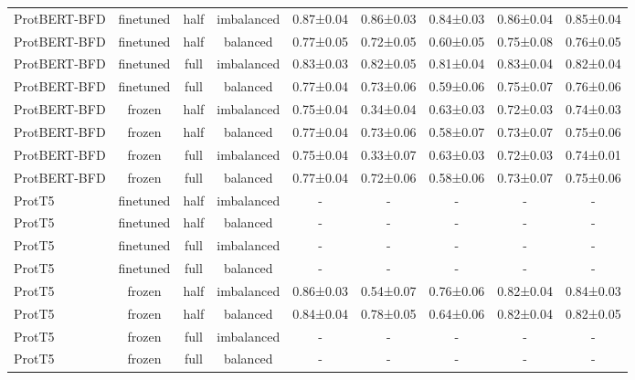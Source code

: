 \begin{tabular}{lcccccccc}
ProtBERT-BFD &      finetuned &      half & imbalanced & 0.87±0.04 & 0.86±0.03 & 0.84±0.03 & 0.86±0.04 & 0.85±0.04 \\
ProtBERT-BFD &      finetuned &      half &   balanced & 0.77±0.05 & 0.72±0.05 & 0.60±0.05 & 0.75±0.08 & 0.76±0.05 \\
ProtBERT-BFD &      finetuned &      full & imbalanced & 0.83±0.03 & 0.82±0.05 & 0.81±0.04 & 0.83±0.04 & 0.82±0.04 \\
ProtBERT-BFD &      finetuned &      full &   balanced & 0.77±0.04 & 0.73±0.06 & 0.59±0.06 & 0.75±0.07 & 0.76±0.06 \\
ProtBERT-BFD &         frozen &      half & imbalanced & 0.75±0.04 & 0.34±0.04 & 0.63±0.03 & 0.72±0.03 & 0.74±0.03 \\
ProtBERT-BFD &         frozen &      half &   balanced & 0.77±0.04 & 0.73±0.06 & 0.58±0.07 & 0.73±0.07 & 0.75±0.06 \\
ProtBERT-BFD &         frozen &      full & imbalanced & 0.75±0.04 & 0.33±0.07 & 0.63±0.03 & 0.72±0.03 & 0.74±0.01 \\
ProtBERT-BFD &         frozen &      full &   balanced & 0.77±0.04 & 0.72±0.06 & 0.58±0.06 & 0.73±0.07 & 0.75±0.06 \\
      ProtT5 &      finetuned &      half & imbalanced &         - &         - &         - &         - &         - \\
      ProtT5 &      finetuned &      half &   balanced &         - &         - &         - &         - &         - \\
      ProtT5 &      finetuned &      full & imbalanced &         - &         - &         - &         - &         - \\
      ProtT5 &      finetuned &      full &   balanced &         - &         - &         - &         - &         - \\
      ProtT5 &         frozen &      half & imbalanced & 0.86±0.03 & 0.54±0.07 & 0.76±0.06 & 0.82±0.04 & 0.84±0.03 \\
      ProtT5 &         frozen &      half &   balanced & 0.84±0.04 & 0.78±0.05 & 0.64±0.06 & 0.82±0.04 & 0.82±0.05 \\
      ProtT5 &         frozen &      full & imbalanced &         - &         - &         - &         - &         - \\
      ProtT5 &         frozen &      full &   balanced &         - &         - &         - &         - &         - \\
\bottomrule
\end{tabular}
